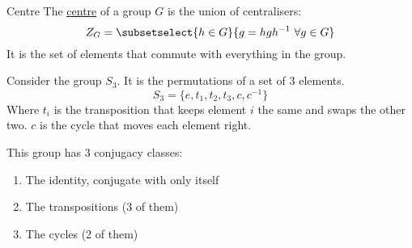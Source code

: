 \documentclass[../Main.tex]{subfiles}
\begin{document}
\begin{definition}{Centre}
    The \underline{centre} of a group $G$ is the union of centralisers:
    \begin{equation*}
        Z_G = \subsetselect{h \in G}{g = hgh^{-1}~\forall g \in G}
    \end{equation*}
    It is the set of elements that commute with everything in the group.
\end{definition}
\begin{example}
    Consider the group $S_3$. It is the permutations of a set of 3 elements.
    \begin{equation*}
        S_3 = \{e, t_1, t_2, t_3, c, c^{-1}\}
    \end{equation*}
    Where $t_i$ is the transposition that keeps element $i$ the same and swaps the other two. $c$ is the cycle that moves each element right.\par
    This group has 3 conjugacy classes:
    \begin{enumerate}
        \item The identity, conjugate with only itself
        \item The transpositions (3 of them)
        \item The cycles (2 of them)
    \end{enumerate}
\end{example}
\end{document}
